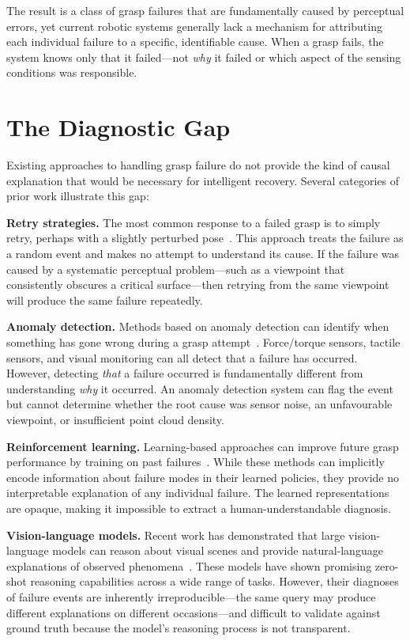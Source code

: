 \documentclass[11pt,a4paper]{report}
\begin{document}
The result is a class of grasp failures that are fundamentally caused by perceptual errors, yet current robotic systems generally lack a mechanism for attributing each individual failure to a specific, identifiable cause. When a grasp fails, the system knows only that it failed---not \emph{why} it failed or which aspect of the sensing conditions was responsible.

\section{The Diagnostic Gap}
\label{sec:diagnostic_gap}

Existing approaches to handling grasp failure do not provide the kind of causal explanation that would be necessary for intelligent recovery. Several categories of prior work illustrate this gap:

\textbf{Retry strategies.} The most common response to a failed grasp is to simply retry, perhaps with a slightly perturbed pose~\cite{hsiao2010contact}. This approach treats the failure as a random event and makes no attempt to understand its cause. If the failure was caused by a systematic perceptual problem---such as a viewpoint that consistently obscures a critical surface---then retrying from the same viewpoint will produce the same failure repeatedly.

\textbf{Anomaly detection.} Methods based on anomaly detection can identify when something has gone wrong during a grasp attempt~\cite{park2018multimodal}. Force/torque sensors, tactile sensors, and visual monitoring can all detect that a failure has occurred. However, detecting \emph{that} a failure occurred is fundamentally different from understanding \emph{why} it occurred. An anomaly detection system can flag the event but cannot determine whether the root cause was sensor noise, an unfavourable viewpoint, or insufficient point cloud density.

\textbf{Reinforcement learning.} Learning-based approaches can improve future grasp performance by training on past failures~\cite{levine2018learning, kalashnikov2018scalable}. While these methods can implicitly encode information about failure modes in their learned policies, they provide no interpretable explanation of any individual failure. The learned representations are opaque, making it impossible to extract a human-understandable diagnosis.

\textbf{Vision-language models.} Recent work has demonstrated that large vision-language models can reason about visual scenes and provide natural-language explanations of observed phenomena~\cite{ahn2022saycan, driess2023palm}. These models have shown promising zero-shot reasoning capabilities across a wide range of tasks. However, their diagnoses of failure events are inherently irreproducible---the same query may produce different explanations on different occasions---and difficult to validate against ground truth because the model's reasoning process is not transparent.
\end{document}

